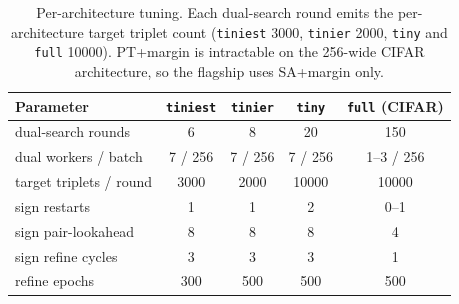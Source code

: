 \documentclass[runningheads,orivec]{llncs}
\begin{document}
\begin{table}[H]
\centering
\caption{Per-architecture tuning. Each dual-search round emits the per-architecture
target triplet count (\texttt{tiniest} 3000, \texttt{tinier} 2000, \texttt{tiny} and
\texttt{full} 10000). PT+margin is intractable on the 256-wide CIFAR architecture, so
the flagship uses SA+margin only.}
\label{tab:params-arch}
\setlength{\tabcolsep}{5pt}\small
\begin{tabular}{lcccc}
\toprule
Parameter & \texttt{tiniest} & \texttt{tinier} & \texttt{tiny} & \texttt{full} (CIFAR) \\
\midrule
dual-search rounds        & 6       & 8       & 20      & 150 \\
dual workers / batch      & 7 / 256 & 7 / 256 & 7 / 256 & 1--3 / 256 \\
target triplets / round   & 3000    & 2000    & 10000   & 10000 \\
sign restarts             & 1       & 1       & 2       & 0--1 \\
sign pair-lookahead       & 8       & 8       & 8       & 4 \\
sign refine cycles        & 3       & 3       & 3       & 1 \\
refine epochs             & 300     & 500     & 500     & 500 \\
\bottomrule
\end{tabular}
\end{table}
\end{document}
